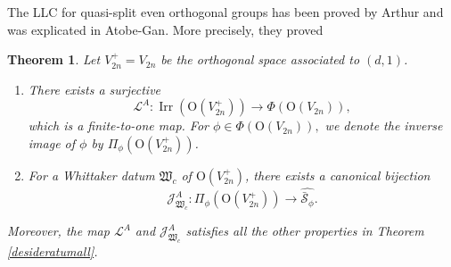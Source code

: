 \documentclass[article]{article}
\numberwithin{equation}{section}
\newtheorem{theorem}{Theorem}[section]
\theoremstyle{definition}
\DeclareMathOperator{\Irr}{Irr}
\begin{document}
The LLC for quasi-split even orthogonal groups has been proved by Arthur\cite{MR3135650} and was explicated in Atobe-Gan\cite{MR3708200}. More precisely, they proved
\begin{theorem}\label{Arthurorth}
	Let $V^+_{2n}=V_{2n}$ be the orthogonal space associated to $(d,1)$. 
	\begin{enumerate}[(1).]
		\item There exists a surjective 
		$$
		\mathcal L^{A}: \Irr\left(\mathrm O(V_{2n}^{+})\right) \longrightarrow \Phi\left(\mathrm O(V_{2n})\right),$$
		which is a finite-to-one map. For $\phi \in \Phi(\mathrm O(V_{2n})),$ we denote the inverse image of $\phi$ by $\Pi_{\phi}(\mathrm O(V^+_{2n}))$. 
		\item For a Whittaker datum $\mathfrak W_{c}$ of $\mathrm O(V_{2n}^+)$, there exists a canonical bijection
		$$\mathcal J_{\mathfrak W_{c}}^A: \Pi_{\phi}(\mathrm O(V_{2n}^+)) \longrightarrow \widehat{\bar {\mathcal {S}}_{\phi}}.$$
	\end{enumerate}  
	 Moreover, the map $\mathcal L^A$ and $\mathcal J_{\mathfrak W_{c}}^A$ satisfies all the other properties in Theorem  \ref{desideratumall}. 
\end{theorem}
\end{document}
